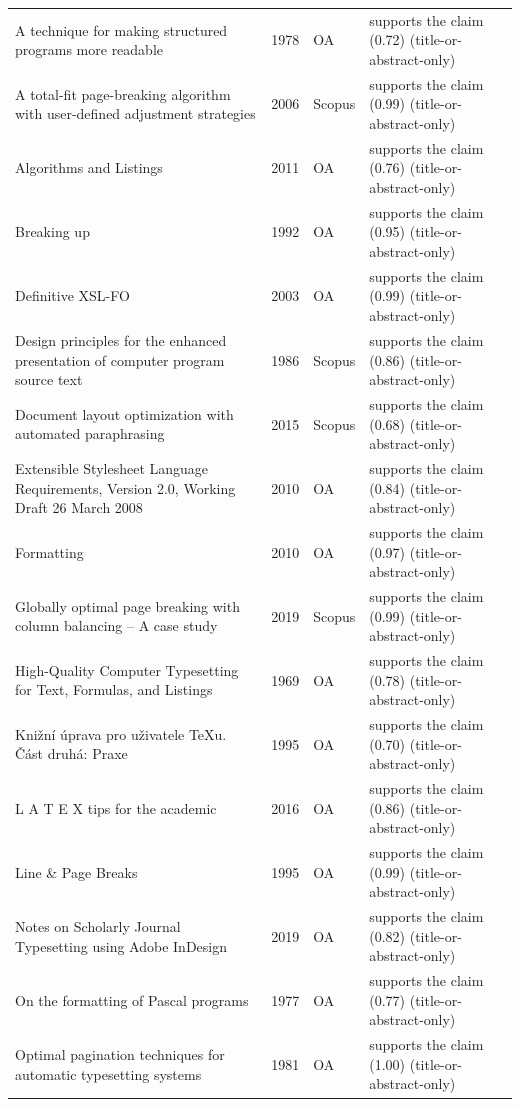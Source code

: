 \begin{longtable}{@{}%
  >{\raggedright\arraybackslash}p{}c%
  >{\raggedright\arraybackslash}p{}%
  >{\raggedright\arraybackslash}p{}@{}}
A technique for making structured programs more readable & 1978 & OA & supports the claim (0.72) (title-or-abstract-only) \\
A total-fit page-breaking algorithm with user-defined adjustment strategies & 2006 & Scopus & supports the claim (0.99) (title-or-abstract-only) \\
Algorithms and Listings & 2011 & OA & supports the claim (0.76) (title-or-abstract-only) \\
Breaking up & 1992 & OA & supports the claim (0.95) (title-or-abstract-only) \\
Definitive XSL-FO & 2003 & OA & supports the claim (0.99) (title-or-abstract-only) \\
Design principles for the enhanced presentation of computer program source text & 1986 & Scopus & supports the claim (0.86) (title-or-abstract-only) \\
Document layout optimization with automated paraphrasing & 2015 & Scopus & supports the claim (0.68) (title-or-abstract-only) \\
Extensible Stylesheet Language Requirements, Version 2.0, Working Draft 26 March 2008 & 2010 & OA & supports the claim (0.84) (title-or-abstract-only) \\
Formatting & 2010 & OA & supports the claim (0.97) (title-or-abstract-only) \\
Globally optimal page breaking with column balancing -- A case study & 2019 & Scopus & supports the claim (0.99) (title-or-abstract-only) \\
High-Quality Computer Typesetting for Text, Formulas, and Listings & 1969 & OA & supports the claim (0.78) (title-or-abstract-only) \\
Knižní úprava pro uživatele TeXu. Část druhá: Praxe & 1995 & OA & supports the claim (0.70) (title-or-abstract-only) \\
L A T E X tips for the academic & 2016 & OA & supports the claim (0.86) (title-or-abstract-only) \\
Line \& Page Breaks & 1995 & OA & supports the claim (0.99) (title-or-abstract-only) \\
Notes on Scholarly Journal Typesetting using Adobe InDesign & 2019 & OA & supports the claim (0.82) (title-or-abstract-only) \\
On the formatting of Pascal programs & 1977 & OA & supports the claim (0.77) (title-or-abstract-only) \\
Optimal pagination techniques for automatic typesetting systems & 1981 & OA & supports the claim (1.00) (title-or-abstract-only) \\

\end{longtable}
